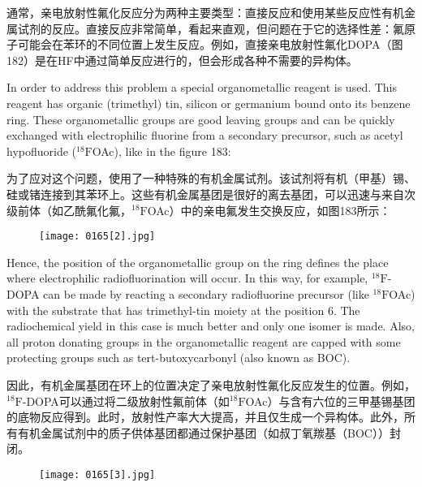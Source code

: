 \documentclass[dvipsnames, svgnames,a4paper,11pt]{article}
\begin{document}
通常，亲电放射性氟化反应分为两种主要类型：直接反应和使用某些反应性有机金属试剂的反应。直接反应非常简单，看起来直观，但问题在于它的选择性差：氟原子可能会在苯环的不同位置上发生反应。例如，直接亲电放射性氟化DOPA（图182）是在HF中通过简单反应进行的，但会形成各种不需要的异构体。



In order to address this problem a special organometallic reagent is used. This
reagent has organic (trimethyl) tin, silicon or germanium bound onto its benzene ring.
These organometallic groups are good leaving groups and can be quickly
exchanged with electrophilic fluorine from a secondary precursor, such as acetyl
hypofluoride (${}^\mathrm{18}\mathrm{F}$OAc), like in the figure 183:

为了应对这个问题，使用了一种特殊的有机金属试剂。该试剂将有机（甲基）锡、硅或锗连接到其苯环上。这些有机金属基团是很好的离去基团，可以迅速与来自次级前体（如乙酰氟化氟，${}^\mathrm{18}\mathrm{F}$OAc）中的亲电氟发生交换反应，如图183所示：

\begin{figure}[h]
	\centering
    \texttt{[image: 0165[2].jpg]}    
     \label{fig183}
\end{figure}


Hence, the position of the organometallic group on the ring defines the place where
electrophilic radiofluorination will occur. In this way, for example, ${}^\mathrm{18}\mathrm{F}$-DOPA can be
made by reacting a secondary radiofluorine precursor (like ${}^\mathrm{18}\mathrm{F}$OAc) with the
substrate that has trimethyl-tin moiety at the position 6. The radiochemical yield in
this case is much better and only one isomer is made. Also, all proton donating
groups in the organometallic reagent are capped with some protecting groups such
as tert-butoxycarbonyl (also known as BOC).

因此，有机金属基团在环上的位置决定了亲电放射性氟化反应发生的位置。例如，${}^\mathrm{18}\mathrm{F}$-DOPA可以通过将二级放射性氟前体（如${}^\mathrm{18}\mathrm{F}$OAc）与含有六位的三甲基锡基团的底物反应得到。此时，放射性产率大大提高，并且仅生成一个异构体。此外，所有有机金属试剂中的质子供体基团都通过保护基团（如叔丁氧羰基（BOC））封闭。
\begin{figure}[h]
	\centering
    \texttt{[image: 0165[3].jpg]}    
     \label{fig184}
\end{figure}
\end{document}
